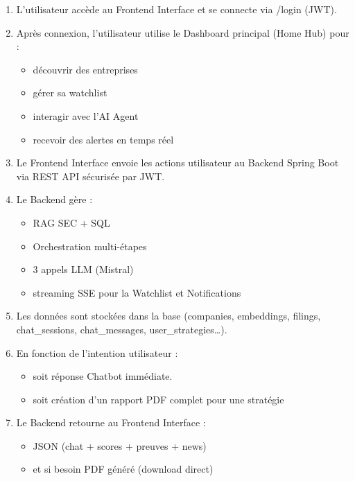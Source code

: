 \begin{enumerate}
    \item L'utilisateur accède au Frontend Interface  et se connecte via /login (JWT).
    
    \item Après connexion, l'utilisateur utilise le Dashboard principal (Home Hub) pour :
    \begin{itemize}
        \item découvrir des entreprises
        \item gérer sa watchlist
        \item interagir avec l'AI Agent
        \item recevoir des alertes en temps réel
    \end{itemize}
    
    \item Le Frontend Interface envoie les actions utilisateur au Backend Spring Boot via REST API sécurisée par JWT.
    
    \item Le Backend gère :
    \begin{itemize}
        \item RAG SEC + SQL
        \item Orchestration multi-étapes
        \item 3 appels LLM (Mistral)
        \item streaming SSE pour la Watchlist et Notifications
    \end{itemize}
    
    \item Les données sont stockées dans la base (companies, embeddings, filings, chat\_sessions, chat\_messages, user\_strategies\ldots).
    
    \item En fonction de l'intention utilisateur :
    \begin{itemize}
        \item soit réponse Chatbot immédiate.
        \item soit création d'un rapport PDF complet pour une stratégie
    \end{itemize}
    
    \item Le Backend retourne au Frontend Interface :
    \begin{itemize}
        \item JSON (chat + scores + preuves + news)
        \item et si besoin PDF généré (download direct)
    \end{itemize}
\end{enumerate}
